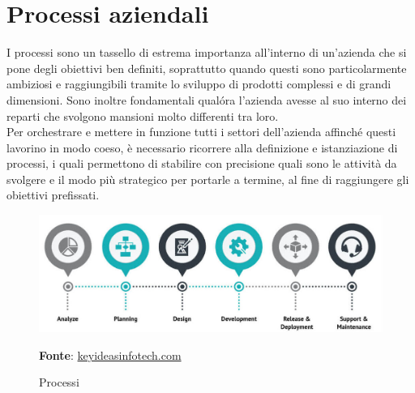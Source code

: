\section{Processi aziendali}
    I processi sono un tassello di estrema importanza all'interno di un'azienda che si pone degli obiettivi ben definiti, soprattutto quando questi sono particolarmente ambiziosi e raggiungibili tramite lo sviluppo di prodotti complessi e di grandi dimensioni. Sono inoltre fondamentali qual\'{o}ra l'azienda avesse al suo interno dei reparti che svolgono mansioni molto differenti tra loro. \\
    Per orchestrare e mettere in funzione tutti i settori dell'azienda affinché questi lavorino in modo coeso, è necessario ricorrere alla definizione e istanziazione di processi, i quali permettono di stabilire con precisione quali sono le attività da svolgere e il modo più strategico per portarle a termine, al fine di raggiungere gli obiettivi prefissati.
    
    \begin{figure}[ht]
        \centering
        \includegraphics[width=1\textwidth]{immagini/process.jpg}
        \caption{Processi}
        \textbf{Fonte}: \href{https://www.keyideasinfotech.com/wp-content/uploads/blog/Web-and-e-commerce-software-development-processes.jpg}{keyideasinfotech.com}
        \label{fig: Processi}
    \end{figure}
    
